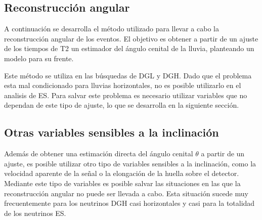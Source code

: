 	
	
	\subsection{Reconstrucción angular}
	\label{sbsc:thetaRec}
	A continuación se desarrolla el método utilizado para llevar a cabo la reconstrucción angular de los eventos. 
	El objetivo es obtener a partir de un ajuste de los tiempos de T2 un estimador del ángulo cenital de la lluvia, planteando un modelo para su frente.
	
	
	
	
	
	Este método se utiliza en las búsquedas de DGL y DGH.
	Dado que el problema esta mal condicionado para lluvias horizontales, no es posible utilizarlo en el analisis de ES.
	Para salvar este problema es necesario utilizar variables que no dependan de este tipo de ajuste, lo que se desarrolla en la siguiente sección.
	
	\subsection{Otras variables sensibles a la inclinación}
	
	Además de obtener una estimación directa del ángulo cenital $\theta$ a partir de un ajuste, es posible utilizar otro tipo de variables sensibles a la inclinación, como la velocidad aparente de la señal o la elongación de la huella sobre el detector.
	Mediante este tipo de variables es posible salvar las situaciones en las que la reconstrucción angular no puede ser llevada a cabo.
	Esta situación sucede muy frecuentemente para los neutrinos DGH casi horizontales y casi para la totalidad de los neutrinos ES.
	

